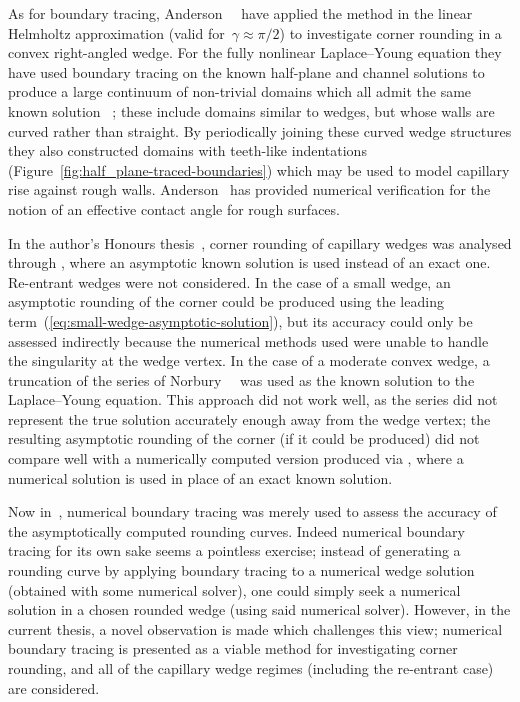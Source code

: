 As for boundary tracing,
Anderson~\etal~\cite{anderson-2007-boundary-tracing-ii-applications}
have applied the method in the linear Helmholtz approximation
(valid for~$\gamma \approx \pi/2$)
to investigate corner rounding in a convex right-angled wedge.
For the fully nonlinear Laplace--Young equation
they have used boundary tracing
on the known half-plane and channel solutions
to produce a large continuum of non-trivial domains
which all admit the same known solution~%
  \cite{anderson-2006-exact-solutions-laplace-young};
these include domains similar to wedges,
but whose walls are curved rather than straight.
By periodically joining these curved wedge structures
they also constructed domains with teeth-like indentations
(Figure~\ref{fig:half_plane-traced-boundaries})
which may be used to model capillary rise against rough walls.
Anderson~\cite[Section~6.4.5]{anderson-2002-thesis-boundary-tracing-pdes}
has provided numerical verification
for the notion of an effective contact angle for rough surfaces.

In the author's Honours thesis~\cite{li-2017-thesis-rounding-capillary-wedge},
corner rounding of capillary wedges was analysed
through ,
where an asymptotic known solution is used instead of an exact one.
Re-entrant wedges were not considered.
In the case of a small wedge,
an asymptotic rounding of the corner could be produced
using the leading term~(\ref{eq:small-wedge-asymptotic-solution}),
but its accuracy could only be assessed indirectly
because the numerical methods used were unable to handle
the singularity at the wedge vertex.
In the case of a moderate convex wedge,
a truncation of the series of
Norbury~\etal~\cite{norbury-2005-corner-solutions-laplace-young}
was used as the known solution to the Laplace--Young equation.
This approach did not work well,
as the series did not represent the true solution accurately enough
away from the wedge vertex;
the resulting asymptotic rounding of the corner (if it could be produced)
did not compare well with a numerically computed version
produced via ,
where a numerical solution is used in place of an exact known solution.

Now in~\cite{li-2017-thesis-rounding-capillary-wedge},
numerical boundary tracing was merely used
to assess the accuracy of the asymptotically computed rounding curves.
Indeed numerical boundary tracing for its own sake
seems a pointless exercise;
instead of generating a rounding curve
by applying boundary tracing to a numerical wedge solution
(obtained with some numerical solver),
one could simply seek a numerical solution in a chosen rounded wedge
(using said numerical solver).
However, in the current thesis,
a novel observation is made which challenges this view;
numerical boundary tracing is presented as a viable method
for investigating corner rounding,
and all of the capillary wedge regimes (including the re-entrant case)
are considered.

